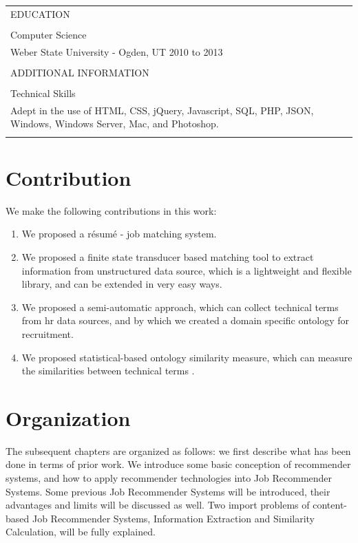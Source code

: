 \begin{table}[!p]
\begin{tabular}{    |  p{15cm} |  }
\\
EDUCATION\\
\\
Computer Science \\
Weber State University - Ogden, UT 2010 to 2013 \\
\\
ADDITIONAL INFORMATION \\
\\
Technical Skills \\
Adept in the use of HTML, CSS, jQuery, Javascript, SQL, PHP, JSON, Windows, Windows Server, Mac, and Photoshop. \\

\\
\hline

\end{tabular}
\label{tab:resume} %
\end{table}


\section{Contribution}

We make the following contributions in this work:

\begin{enumerate}
    \item  We proposed a r\'esum\'e - job matching system.
    \item  We proposed a finite state transducer based matching tool to extract information from unstructured data source, which is a lightweight and flexible library, and can be extended in very easy ways.
    \item  We proposed a semi-automatic approach, which can collect technical terms from hr data sources, and by which we created a domain specific ontology for recruitment.
    \item  We proposed statistical-based ontology similarity measure, which can measure the similarities between technical terms .
\end{enumerate}

\section{Organization}
The subsequent chapters are organized as follows: we first describe what has been done in terms of prior work.  We introduce some basic conception of recommender systems, and how to apply recommender technologies into Job Recommender Systems. Some previous Job Recommender Systems will be introduced,  their advantages and limits will be discussed as well.  Two import problems of content-based Job Recommender Systems, Information Extraction and Similarity Calculation, will be fully explained.

